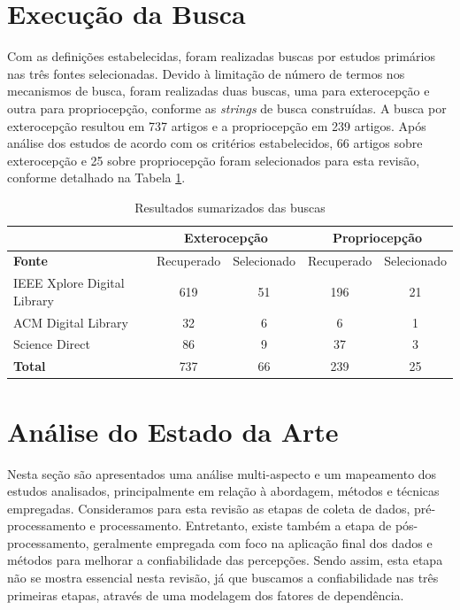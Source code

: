 \section{Execução da Busca}

Com as definições estabelecidas, foram realizadas buscas por estudos primários nas três fontes selecionadas. Devido à limitação de número de termos nos mecanismos de busca, foram realizadas duas buscas, uma para exterocepção e outra para propriocepção, conforme as \textit{strings} de busca construídas. A busca por exterocepção resultou em 737 artigos e a propriocepção em 239 artigos. Após análise dos estudos de acordo com os critérios estabelecidos, 66 artigos sobre exterocepção e 25 sobre propriocepção foram selecionados para esta revisão, conforme detalhado na Tabela \ref{tabela:resultados_sumarizados_busca}. 

\begin{table}[h]
    \caption{Resultados sumarizados das buscas}
    \label{tabela:resultados_sumarizados_busca}
    \centering
    \small
    \begin{tabular}{lcccc}
    \cmidrule(l){2-5} & \multicolumn{2}{c}{\textbf{Exterocepção}} & \multicolumn{2}{c}{\textbf{Propriocepção}} \\ \midrule
    \textbf{Fonte} & Recuperado & Selecionado & Recuperado & Selecionado \\ \midrule
    IEEE Xplore Digital Library & 619 & 51 & 196 & 21 \\ \midrule
    ACM Digital Library & 32 & 6 & 6 & 1 \\ \midrule
    Science Direct & 86 & 9 & 37 & 3 \\ \midrule
    \textbf{Total} & 737 & 66 & 239 & 25 \\ \bottomrule
    \end{tabular}
\end{table}

\section{Análise do Estado da Arte}

Nesta seção são apresentados uma análise multi-aspecto e um mapeamento dos estudos analisados, principalmente em relação à abordagem, métodos e técnicas empregadas. Consideramos para esta revisão as etapas de coleta de dados, pré-processamento e processamento. Entretanto, existe também a etapa de pós-processamento, geralmente empregada com foco na aplicação final dos dados e métodos para melhorar a confiabilidade das percepções. Sendo assim, esta etapa não se mostra essencial nesta revisão, já que buscamos a confiabilidade nas três primeiras etapas, através de uma modelagem dos fatores de dependência. 

